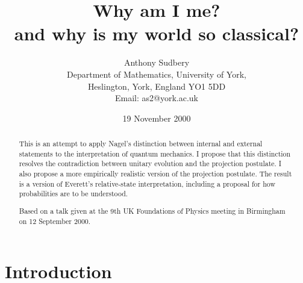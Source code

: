 \documentclass[12pt,a4paper,reqno]{article}
\renewcommand{\(}{\left(}
\renewcommand{\)}{\right)}
\newcommand{\<}{\langle}
\renewcommand{\>}{\rangle}
\theoremstyle{plain} %
\theoremstyle{definition}
\theoremstyle{remark}
\begin{document}
\title{Why am I me?\\ and why is my world so classical?}
\author{Anthony Sudbery\\[10pt] \small Department of Mathematics,    
University of York,\\[-2pt] \small Heslington, York, England YO1 5DD\\    
\small  Email: as2@york.ac.uk}
\date{19 November 2000}
\maketitle
\begin{abstract}
This is an attempt to apply Nagel's distinction between internal
and external statements to the interpretation of quantum mechanics. I
propose that this distinction resolves the contradiction between unitary
evolution and the projection postulate. I also propose a more empirically
realistic version of the projection postulate. The result is a version of
Everett's relative-state interpretation, including a proposal for how
probabilities are to be understood.

Based on a talk given at the 9th UK Foundations of Physics
meeting in Birmingham on 12 September 2000.

\end{abstract}

\thispagestyle{empty}
\newpage

\section{Introduction}
\end{document}
